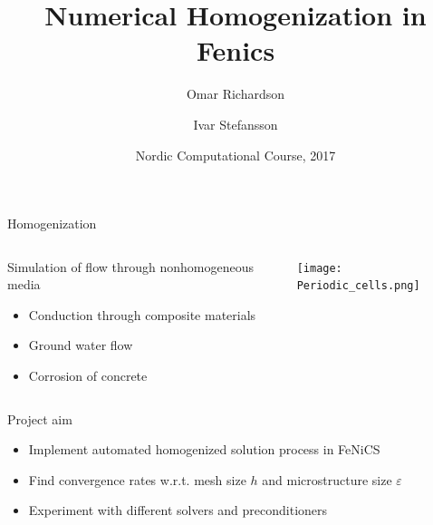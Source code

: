 \documentclass{beamer}
\title[Numerical homogenization]{Numerical Homogenization in Fenics}
\author[O. Richardson \and I. Stefansson] %
{Omar Richardson \and Ivar Stefansson}
\institute %
{
    Karlstad University, Sweden \and University of Bergen, Norway
}
\date[]{Nordic Computational Course, 2017}
\renewcommand{\epsilon}{\varepsilon}
\begin{document}
  \frame{\titlepage}
\begin{frame}{Homogenization}
    \begin{columns}
        \begin{column}[c]{.5\textwidth}
            Simulation of flow through nonhomogeneous media
            \begin{itemize}
              \item Conduction through composite materials
              \item Ground water flow
              \item Corrosion of concrete
            \end{itemize}
        \end{column}
        \begin{column}[c]{.5\textwidth}
            \texttt{[image: Periodic\_cells.png]}
        \end{column}
    \end{columns}
\end{frame}

\begin{frame}[c]{Project aim}
    \begin{itemize}
        \item Implement automated homogenized solution process in FeNiCS
        \item Find convergence rates w.r.t. mesh size $h$ and microstructure size $\epsilon$
        \item Experiment with different solvers and preconditioners
    \end{itemize}
\end{frame}
\end{document}
